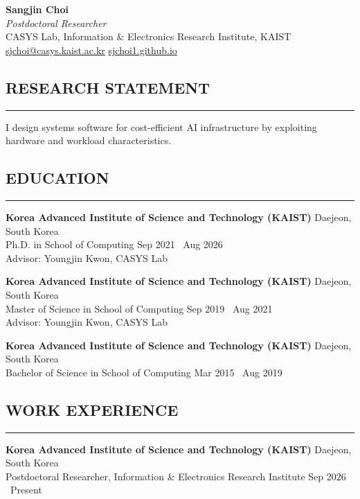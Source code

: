\documentclass[10pt,a4paper]{article}
\newcommand{\cvsection}[1]{
  \subsection*{#1}
  \vspace{1.5mm}
  \hrule
  \vspace{0.5mm}
}
\newcommand{\email}[1]{\href{mailto:#1}{#1}}
\begin{document}
\thispagestyle{empty}

\begin{center}
  {\LARGE\bfseries Sangjin Choi}\\
  \vspace{0.1cm}
  \textit{Postdoctoral Researcher}\\
  CASYS Lab, Information \& Electronics Research Institute, KAIST\\
  \email{sjchoi@casys.kaist.ac.kr} \quad \textbar\quad \href{https://sjchoi1.github.io/}{sjchoi1.github.io}
\end{center}

\vspace{0.1cm}

\cvsection{RESEARCH STATEMENT}

I design systems software for cost-efficient AI infrastructure by exploiting hardware and workload characteristics.

\cvsection{EDUCATION}

\noindent
\textbf{Korea Advanced Institute of Science and Technology (KAIST)} \hfill Daejeon, South Korea\\
\hspace*{12pt}Ph.D. in School of Computing \hfill Sep 2021 \textendash\ Aug 2026\\
\hspace*{12pt}Advisor: Youngjin Kwon, CASYS Lab

\noindent
\textbf{Korea Advanced Institute of Science and Technology (KAIST)} \hfill Daejeon, South Korea\\
\hspace*{12pt}Master of Science in School of Computing \hfill Sep 2019 \textendash\ Aug 2021\\
\hspace*{12pt}Advisor: Youngjin Kwon, CASYS Lab

\noindent
\textbf{Korea Advanced Institute of Science and Technology (KAIST)} \hfill Daejeon, South Korea\\
\hspace*{12pt}Bachelor of Science in School of Computing \hfill Mar 2015 \textendash\ Aug 2019

\cvsection{WORK EXPERIENCE}

\noindent
\textbf{Korea Advanced Institute of Science and Technology (KAIST)} \hfill Daejeon, South Korea\\
\hspace*{12pt}Postdoctoral Researcher, Information \& Electronics Research Institute \hfill Sep 2026 \textendash\ Present
\end{document}
